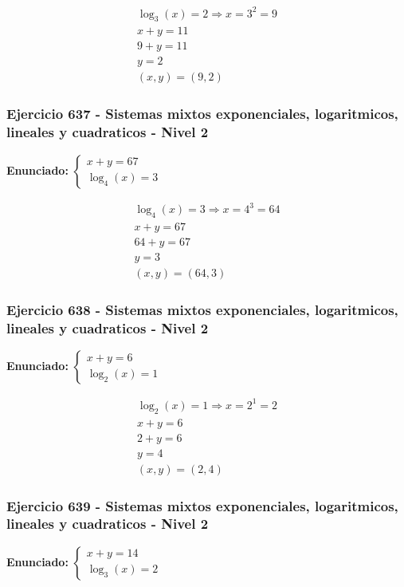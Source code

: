 \documentclass[12pt,a4paper]{article}
\begin{document}
\[
\begin{aligned}
\log_{3}\left(x\right)=2\Rightarrow x=3^{2}=9\\
x+y=11\\
9+y=11\\
y=2\\
\boxed{(x,y)=(9,2)}
\end{aligned}
\]


\subsubsection*{Ejercicio 637 - Sistemas mixtos exponenciales, logaritmicos, lineales y cuadraticos - Nivel 2}
\textbf{Enunciado:} \(\begin{cases} x+y=67\\ \log_{4}\left(x\right)=3\end{cases}\)

\[
\begin{aligned}
\log_{4}\left(x\right)=3\Rightarrow x=4^{3}=64\\
x+y=67\\
64+y=67\\
y=3\\
\boxed{(x,y)=(64,3)}
\end{aligned}
\]


\subsubsection*{Ejercicio 638 - Sistemas mixtos exponenciales, logaritmicos, lineales y cuadraticos - Nivel 2}
\textbf{Enunciado:} \(\begin{cases} x+y=6\\ \log_{2}\left(x\right)=1\end{cases}\)

\[
\begin{aligned}
\log_{2}\left(x\right)=1\Rightarrow x=2^{1}=2\\
x+y=6\\
2+y=6\\
y=4\\
\boxed{(x,y)=(2,4)}
\end{aligned}
\]


\subsubsection*{Ejercicio 639 - Sistemas mixtos exponenciales, logaritmicos, lineales y cuadraticos - Nivel 2}
\textbf{Enunciado:} \(\begin{cases} x+y=14\\ \log_{3}\left(x\right)=2\end{cases}\)
\end{document}
